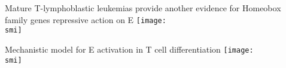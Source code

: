 \documentclass[10pt]{beamer}
\def\smi{out/ln/updir/mw-gcthesis-oral/library.bib}
\begin{document}
    \begin{frame}{Mature T-lymphoblastic leukemias provide another evidence for Homeobox family genes repressive action on E\textalpha{}}
      \def\smi{out/ln/updir/mw-gcthesis-oral/ink/tall/ealpha_h3k27ac_groups.pdf}
      \texttt{[image: \\smi]}%
    \end{frame}
    \begin{frame}{Mechanistic model for E\textalpha{} activation in T cell differentiation}
      \def\smi{out/ln/updir/mw-gcthesis-oral/ink/Highlight_HOXA_Blueprint_paper.pdf}
      \texttt{[image: \\smi]}%
    \end{frame}
\end{document}
